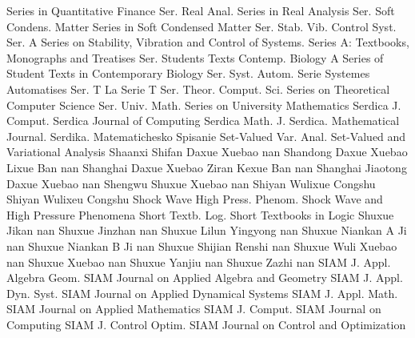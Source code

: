 {Series in Quantitative Finance}
{Ser. Real Anal.}
{Series in Real Analysis}
{Ser. Soft Condens. Matter}
{Series in Soft Condensed Matter}
{Ser. Stab. Vib. Control Syst. Ser. A}
{Series on Stability, Vibration and Control of Systems. Series A: Textbooks, Monographs and Treatises}
{Ser. Students Texts Contemp. Biology}
{A Series of Student Texts in Contemporary Biology}
{Ser. Syst. Autom.}
{Serie Systemes Automatises}
{Ser. T}
{La Serie T}
{Ser. Theor. Comput. Sci.}
{Series on Theoretical Computer Science}
{Ser. Univ. Math.}
{Series on University Mathematics}
{Serdica J. Comput.}
{Serdica Journal of Computing}
{Serdica Math. J.}
{Serdica. Mathematical Journal. Serdika. Matematichesko Spisanie}
{Set-Valued Var. Anal.}
{Set-Valued and Variational Analysis}
{Shaanxi Shifan Daxue Xuebao}
{nan}
{Shandong Daxue Xuebao Lixue Ban}
{nan}
{Shanghai Daxue Xuebao Ziran Kexue Ban}
{nan}
{Shanghai Jiaotong Daxue Xuebao}
{nan}
{Shengwu Shuxue Xuebao}
{nan}
{Shiyan Wulixue Congshu}
{Shiyan Wulixeu Congshu}
{Shock Wave High Press. Phenom.}
{Shock Wave and High Pressure Phenomena}
{Short Textb. Log.}
{Short Textbooks in Logic}
{Shuxue Jikan}
{nan}
{Shuxue Jinzhan}
{nan}
{Shuxue Lilun Yingyong}
{nan}
{Shuxue Niankan A Ji}
{nan}
{Shuxue Niankan B Ji}
{nan}
{Shuxue Shijian Renshi}
{nan}
{Shuxue Wuli Xuebao}
{nan}
{Shuxue Xuebao}
{nan}
{Shuxue Yanjiu}
{nan}
{Shuxue Zazhi}
{nan}
{SIAM J. Appl. Algebra Geom.}
{SIAM Journal on Applied Algebra and Geometry}
{SIAM J. Appl. Dyn. Syst.}
{SIAM Journal on Applied Dynamical Systems}
{SIAM J. Appl. Math.}
{SIAM Journal on Applied Mathematics}
{SIAM J. Comput.}
{SIAM Journal on Computing}
{SIAM J. Control Optim.}
{SIAM Journal on Control and Optimization}
